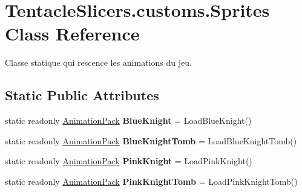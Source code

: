 \hypertarget{class_tentacle_slicers_1_1customs_1_1_sprites}{}\section{Tentacle\+Slicers.\+customs.\+Sprites Class Reference}
\label{class_tentacle_slicers_1_1customs_1_1_sprites}


Classe statique qui rescence les animations du jeu.  


\subsection*{Static Public Attributes}
\begin{DoxyCompactItemize}
\item 
\mbox{\label{class_tentacle_slicers_1_1customs_1_1_sprites_af48e6490c744a3524311a95909cf92cd}} 
static readonly \hyperlink{class_tentacle_slicers_1_1graphics_1_1_animation_pack}{Animation\+Pack} {\bfseries Blue\+Knight} = Load\+Blue\+Knight()
\item 
\mbox{\label{class_tentacle_slicers_1_1customs_1_1_sprites_a1917f9818d51c319c8e6554919b056c5}} 
static readonly \hyperlink{class_tentacle_slicers_1_1graphics_1_1_animation_pack}{Animation\+Pack} {\bfseries Blue\+Knight\+Tomb} = Load\+Blue\+Knight\+Tomb()
\item 
\mbox{\label{class_tentacle_slicers_1_1customs_1_1_sprites_aa4e576eb48cc5a6b392c6fe076cb5cf4}} 
static readonly \hyperlink{class_tentacle_slicers_1_1graphics_1_1_animation_pack}{Animation\+Pack} {\bfseries Pink\+Knight} = Load\+Pink\+Knight()
\item 
\mbox{\label{class_tentacle_slicers_1_1customs_1_1_sprites_a0b2d53bdaa0da042e893e3ae204b8d74}} 
static readonly \hyperlink{class_tentacle_slicers_1_1graphics_1_1_animation_pack}{Animation\+Pack} {\bfseries Pink\+Knight\+Tomb} = Load\+Pink\+Knight\+Tomb()
\item 
\mbox{\label{class_tentacle_slicers_1_1customs_1_1_sprites_ac3c3740383fc9ba6958031d7b7943ef7}} 

\end{DoxyCompactItemize}
